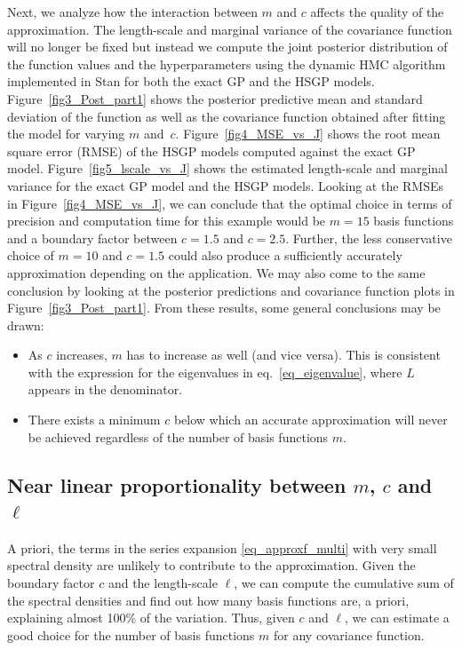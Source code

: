 Next, we analyze how the interaction between $m$ and $c$ affects the quality of the approximation. The length-scale and marginal variance of the covariance function will no longer be fixed but instead we compute the joint posterior distribution of the function values and the hyperparameters using the dynamic HMC algorithm implemented in Stan \citep{StanTeam:2021} for both the exact GP and the HSGP models. Figure~\ref{fig3_Post_part1} shows the posterior predictive mean and standard deviation of the function as well as the covariance function obtained after fitting the model for varying $m$ and~$c$. Figure~\ref{fig4_MSE_vs_J} shows the root mean square error (RMSE) of the HSGP models computed against the exact GP model. Figure~\ref{fig5_lscale_vs_J} shows the estimated length-scale and marginal variance for the exact GP model and the HSGP models. Looking at the RMSEs in Figure~\ref{fig4_MSE_vs_J}, we can conclude that the optimal choice in terms of precision and computation time for this example would be $m = 15$ basis functions and a boundary factor between $c = 1.5$ and $c = 2.5$. Further, the less conservative choice of $m = 10$ and $c = 1.5$ could also produce a sufficiently accurately approximation depending on the application. We may also come to the same conclusion by looking at the posterior predictions and covariance function plots in Figure~\ref{fig3_Post_part1}. From these results, some general conclusions may be drawn:
%
\begin{itemize}
\item As $c$ increases, $m$ has to increase as well (and vice versa). This is consistent with the expression for the eigenvalues in eq.~\eqref{eq_eigenvalue}, where $L$ appears in the denominator.
\item There exists a minimum $c$ below which an accurate approximation will never be achieved regardless of the number of basis functions $m$.
\end{itemize}

\subsection{Near linear proportionality between $m$, $c$ and $\ell$} \label{subsec_theoretic_linearity}

A priori, the terms in the series expansion \eqref{eq_approxf_multi} with very small spectral density are unlikely to contribute to the approximation. Given the boundary factor $c$ and the length-scale $\ell$, we can compute the cumulative sum of the spectral densities and find out how many basis functions are, a priori, explaining almost 100\% of the variation. Thus, given $c$ and $\ell$, we can estimate a good choice for the number of basis functions $m$ for any covariance function.

